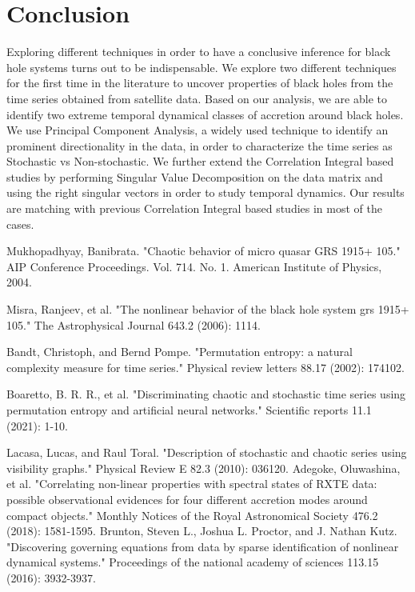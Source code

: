 \documentclass[10pt,conference]{IEEEtran}
\begin{document}
\section{Conclusion}
Exploring different techniques in order to have a conclusive inference for black hole systems turns out to be indispensable. We explore two different techniques for the first time in the literature to uncover  properties of black holes from the time series obtained from satellite data. Based on our analysis, we are able to identify two extreme temporal dynamical classes of accretion around black holes. We use Principal Component Analysis, a widely used technique to identify an prominent directionality in the data, in order to characterize the time series as Stochastic vs Non-stochastic. We further extend the Correlation Integral based studies by performing Singular Value Decomposition on the data matrix and using the right singular vectors in order to study temporal dynamics. Our results  are matching with previous Correlation Integral based studies in most of the cases.


\begin{thebibliography}{1}
 Mukhopadhyay, Banibrata. "Chaotic behavior of micro quasar GRS 1915+ 105." AIP Conference Proceedings. Vol. 714. No. 1. American Institute of Physics, 2004.

Misra, Ranjeev, et al. "The nonlinear behavior of the black hole system grs 1915+ 105." The Astrophysical Journal 643.2 (2006): 1114.

Bandt, Christoph, and Bernd Pompe. "Permutation entropy: a natural complexity measure for time series." Physical review letters 88.17 (2002): 174102.

Boaretto, B. R. R., et al. "Discriminating chaotic and stochastic time series using permutation entropy and artificial neural networks." Scientific reports 11.1 (2021): 1-10.

  Lacasa, Lucas, and Raul Toral. "Description of stochastic and chaotic series using visibility graphs." Physical Review E 82.3 (2010): 036120.
Adegoke, Oluwashina, et al. "Correlating non-linear properties with spectral states of RXTE data: possible observational evidences for four different accretion modes around compact objects." Monthly Notices of the Royal Astronomical Society 476.2 (2018): 1581-1595.
  Brunton, Steven L., Joshua L. Proctor, and J. Nathan Kutz. "Discovering governing equations from data by sparse identification of nonlinear dynamical systems." Proceedings of the national academy of sciences 113.15 (2016): 3932-3937.

\end{thebibliography}
\end{document}
